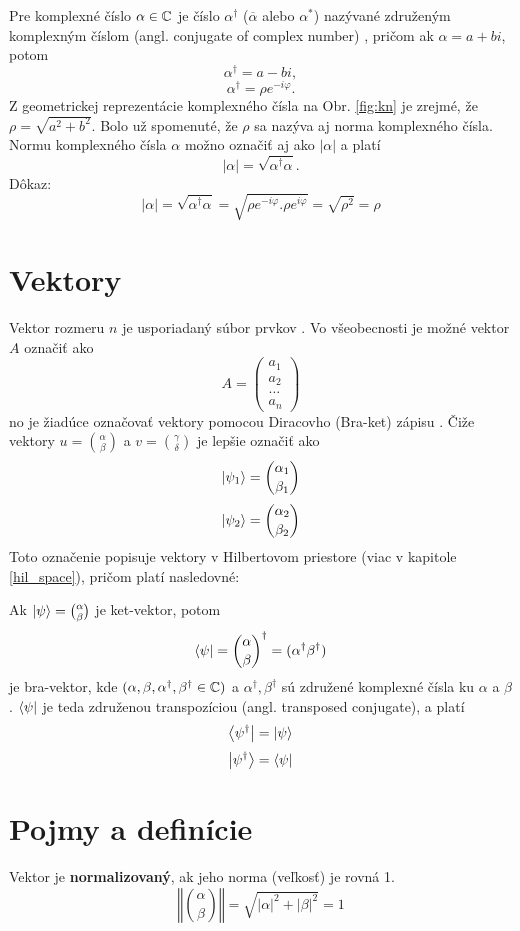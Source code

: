 Pre komplexné číslo \(\alpha \in \mathbb{C}\) je číslo \(\alpha^{\dag}\) (\(\overline{\alpha}\) alebo \(\alpha^{*}\)) nazývané združeným komplexným číslom (angl. conjugate of complex number) \cite{Tit06}, pričom ak \(\alpha = a + bi\), potom 
\[\alpha^{\dag} = a - bi,\] 
\[\alpha^{\dag} = \rho e^{-i\varphi}.\]
Z geometrickej reprezentácie komplexného čísla na Obr. \ref{fig:kn} je zrejmé, že \(\rho = \sqrt{a^2 + b^2}\).
Bolo už spomenuté, že \(\rho\) sa nazýva aj norma komplexného čísla.
Normu komplexného čísla \(\alpha\) možno označiť aj ako \(|\alpha|\) a platí
\[|\alpha| = \sqrt{\alpha^{\dag}\alpha}.\]
Dôkaz:
\[|\alpha| = \sqrt{\alpha^{\dag}\alpha} = \sqrt{\rho e^{-i\varphi}.\rho e^{i\varphi}} = \sqrt{\rho^{2}} = \rho\]

\section{Vektory}
\label{vektory}

Vektor rozmeru \(n\) je usporiadaný súbor prvkov \cite{Ber18}.
Vo všeobecnosti je možné vektor \(A\) označiť ako 
\[A = \begin{pmatrix}
		a_{1} \\
		a_{2}\\
		\dots \\
		a_{n}
     \end{pmatrix}\]
no je žiadúce označovať vektory pomocou Diracovho (Bra-ket) zápisu \cite{Nie+00}.
Čiže vektory \(u = \binom{\alpha}{\beta}\) a \(v = \binom{\gamma}{\delta}\) je lepšie označiť ako 
\[\Ket{\psi_1} = \binom{\alpha_1}{\beta_1}\]
\[\Ket{\psi_2} = \binom{\alpha_2}{\beta_2}\]
Toto označenie popisuje vektory v Hilbertovom priestore (viac v kapitole \ref{hil_space}), pričom platí nasledovné:

Ak \(\Ket{\psi} = \binom{\alpha}{\beta}\) je ket-vektor, potom 
\[\Bra{\psi} = {\binom{\alpha}{\beta}}^{\dag} = (\alpha^{\dag} \beta^{\dag})\]
je  bra-vektor, kde \( ( \alpha, \beta, \alpha^{\dag}, \beta^{\dag} \in \mathbb{C} ) \) a \(\alpha^{\dag}, \beta^{\dag}\) sú združené komplexné čísla ku \(\alpha\) a \(\beta\).
\(\Bra{\psi}\) je teda združenou transpozíciou (angl. transposed conjugate), a platí
\[\Bra{\psi^{\dag}} = \Ket{\psi}\]
\[\Ket{\psi^{\dag}} = \Bra{\psi}\]


\section{Pojmy a definície}
Vektor je \textbf{normalizovaný}, ak jeho norma (veľkosť) je rovná 1.
\[\left\Vert \binom{\alpha}{\beta} \right\Vert = \sqrt{|\alpha|^2 + |\beta|^2}= 1\]

